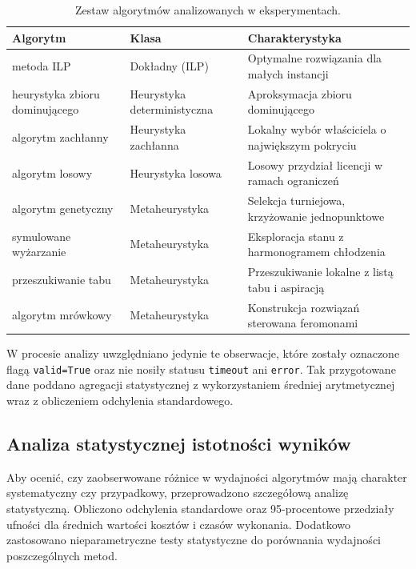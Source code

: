 \begin{table}[H]
  \caption{Zestaw algorytmów analizowanych w eksperymentach.}
  \label{tab:algorithms}
  \centering
  \begin{tabular}{lll}
    \toprule
    \textbf{Algorytm}              & \textbf{Klasa}              & \textbf{Charakterystyka}                         \\
    \midrule
    metoda ILP                     & Dokładny (ILP)              & Optymalne rozwiązania dla małych instancji       \\
    heurystyka zbioru dominującego & Heurystyka deterministyczna & Aproksymacja zbioru dominującego                 \\
    algorytm zachłanny             & Heurystyka zachłanna        & Lokalny wybór właściciela o największym pokryciu \\
    algorytm losowy                & Heurystyka losowa           & Losowy przydział licencji w ramach ograniczeń    \\
    algorytm genetyczny            & Metaheurystyka              & Selekcja turniejowa, krzyżowanie jednopunktowe   \\
    symulowane wyżarzanie          & Metaheurystyka              & Eksploracja stanu z harmonogramem chłodzenia     \\
    przeszukiwanie tabu            & Metaheurystyka              & Przeszukiwanie lokalne z listą tabu i aspiracją  \\
    algorytm mrówkowy              & Metaheurystyka              & Konstrukcja rozwiązań sterowana feromonami       \\
    \bottomrule
  \end{tabular}
\end{table}

W procesie analizy uwzględniano jedynie te obserwacje, które zostały oznaczone flagą \texttt{valid=True} oraz nie nosiły statusu \texttt{timeout} ani \texttt{error}. Tak przygotowane dane poddano agregacji statystycznej z wykorzystaniem średniej arytmetycznej wraz z obliczeniem odchylenia standardowego.

\subsection{Analiza statystycznej istotności wyników}

Aby ocenić, czy zaobserwowane różnice w wydajności algorytmów mają charakter systematyczny czy przypadkowy, przeprowadzono szczegółową analizę statystyczną. Obliczono odchylenia standardowe oraz 95-procentowe przedziały ufności dla średnich wartości kosztów i czasów wykonania. Dodatkowo zastosowano nieparametryczne testy statystyczne do porównania wydajności poszczególnych metod.

